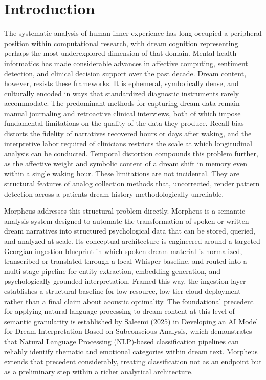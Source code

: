 \documentclass[12pt,a4paper]{report}
\begin{document}
\chapter*{Introduction}
The systematic analysis of human inner experience has long occupied a peripheral position within computational research, with dream cognition representing perhaps the most underexplored dimension of that domain. Mental health informatics has made considerable advances in affective computing, sentiment detection, and clinical decision support over the past decade. Dream content, however, resists these frameworks. It is ephemeral, symbolically dense, and culturally encoded in ways that standardized diagnostic instruments rarely accommodate. The predominant methods for capturing dream data remain manual journaling and retroactive clinical interviews, both of which impose fundamental limitations on the quality of the data they produce. Recall bias distorts the fidelity of narratives recovered hours or days after waking, and the interpretive labor required of clinicians restricts the scale at which longitudinal analysis can be conducted. Temporal distortion compounds this problem further, as the affective weight and symbolic content of a dream shift in memory even within a single waking hour. These limitations are not incidental. They are structural features of analog collection methods that, uncorrected, render pattern detection across a patient\textquotesingle{}s dream history methodologically unreliable.

Morpheus addresses this structural problem directly. Morpheus is a semantic analysis system designed to automate the transformation of spoken or written dream narratives into structured psychological data that can be stored, queried, and analyzed at scale. Its conceptual architecture is engineered around a targeted Georgian ingestion blueprint in which spoken dream material is normalized, transcribed or translated through a local Whisper baseline, and routed into a multi-stage pipeline for entity extraction, embedding generation, and psychologically grounded interpretation. Framed this way, the ingestion layer establishes a structural baseline for low-resource, low-tier cloud deployment rather than a final claim about acoustic optimality. The foundational precedent for applying natural language processing to dream content at this level of semantic granularity is established by Saleemi (2025) in \textquotedbl{}Developing an AI Model for Dream Interpretation Based on Subconscious Analysis,\textquotedbl{} which demonstrates that Natural Language Processing (NLP)-based classification pipelines can reliably identify thematic and emotional categories within dream text. Morpheus extends that precedent considerably, treating classification not as an endpoint but as a preliminary step within a richer analytical architecture.
\end{document}
